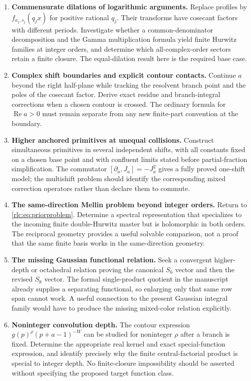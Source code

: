 \documentclass[11pt,a4paper]{article}
\numberwithin{equation}{section}
\theoremstyle{definition}\newtheorem{definition}[theorem]{Definition}
\theoremstyle{remark}\newtheorem{remark}[theorem]{Remark}
\DeclareMathOperator{\Rea}{Re}
\begin{document}
\begin{enumerate}[label=\textbf{Q\arabic*.},leftmargin=2.8em,itemsep=8pt]
\item \textbf{Commensurate dilations of logarithmic arguments.}
Replace profiles by $f_{a_j,s_j}(q_jx)$ for positive rational $q_j$.
Their transforms have cosecant factors with different periods.
Investigate whether a common-denominator decomposition and the Gamma
multiplication formula yield finite Hurwitz families at integer orders,
and determine which all-complex-order sectors retain a finite closure.
The equal-dilation result here is the required base case.

\item \textbf{Complex shift boundaries and explicit contour contacts.}
Continue $a$ beyond the right half-plane while tracking the resolvent
branch point and the poles of the cosecant factor. Derive exact residue
and branch-integral corrections when a chosen contour is crossed.
The ordinary formula for $\Rea a>0$ must remain separate from any new
finite-part convention at the boundary.

\item \textbf{Higher anchored primitives at unequal collisions.}
Construct simultaneous primitives in several independent shifts, with
all constants fixed on a chosen base point and with confluent limits
stated before partial-fraction simplification. The commutator
$[\partial_a,J_a]=-J_a^2$ gives a fully proved one-shift model; the
multishift problem should identify the corresponding mixed correction
operators rather than declare them to commute.

\item \textbf{The same-direction Mellin problem beyond integer orders.}
Return to \eqref{rlc:eq:priorproblem}. Determine a spectral representation
that specializes to the incoming finite double-Hurwitz master but is
holomorphic in both orders. The reciprocal geometry provides a useful
solvable comparison, not a proof that the same finite basis works in the
same-direction geometry.

\item \textbf{The missing Gaussian functional relation.}
Seek a convergent higher-depth or octahedral relation proving the
canonical $S_6$ vector and then the revised $S_8$ vector. The formal
single-product quotient in the manuscript already supplies a separating
functional, so enlarging only that same row span cannot work. A useful
connection to the present Gaussian integral family would have to
produce the missing mixed-color relation explicitly.

\item \textbf{Noninteger convolution depth.}
The contour expression $g(p)^\rho(p+a-1)^{-W}$ can be studied for
noninteger $\rho$ after a branch is fixed. Determine the appropriate
real kernel and exact special-function expression, and identify
precisely why the finite central-factorial product is special to
integer depth. No finite-closure impossibility should be asserted
without specifying the proposed target function class.


\end{enumerate}
\end{document}
